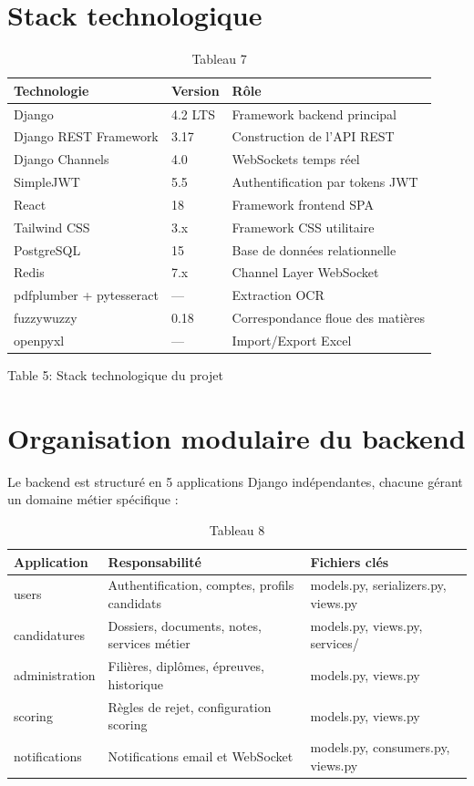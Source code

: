 \section{Stack technologique}

\begin{table}[htbp]
\centering
\begin{tabular}{|l|l|l|}
\hline
Technologie & Version & Rôle \\
\hline
Django & 4.2 LTS & Framework backend principal \\
\hline
Django REST Framework & 3.17 & Construction de l'API REST \\
\hline
Django Channels & 4.0 & WebSockets temps réel \\
\hline
SimpleJWT & 5.5 & Authentification par tokens JWT \\
\hline
React & 18 & Framework frontend SPA \\
\hline
Tailwind CSS & 3.x & Framework CSS utilitaire \\
\hline
PostgreSQL & 15 & Base de données relationnelle \\
\hline
Redis & 7.x & Channel Layer WebSocket \\
\hline
pdfplumber + pytesseract & — & Extraction OCR \\
\hline
fuzzywuzzy & 0.18 & Correspondance floue des matières \\
\hline
openpyxl & — & Import/Export Excel \\
\hline
\end{tabular}
\caption{Tableau 7}
\label{tab:table_7}
\end{table}

Table 5:  Stack technologique du projet

\section{Organisation modulaire du backend}

Le backend est structuré en 5 applications Django indépendantes, chacune gérant un domaine métier spécifique :

\begin{table}[htbp]
\centering
\begin{tabular}{|l|l|l|}
\hline
Application & Responsabilité & Fichiers clés \\
\hline
users & Authentification, comptes, profils candidats & models.py, serializers.py, views.py \\
\hline
candidatures & Dossiers, documents, notes, services métier & models.py, views.py, services/ \\
\hline
administration & Filières, diplômes, épreuves, historique & models.py, views.py \\
\hline
scoring & Règles de rejet, configuration scoring & models.py, views.py \\
\hline
notifications & Notifications email et WebSocket & models.py, consumers.py, views.py \\
\hline
\end{tabular}
\caption{Tableau 8}
\label{tab:table_8}
\end{table}

